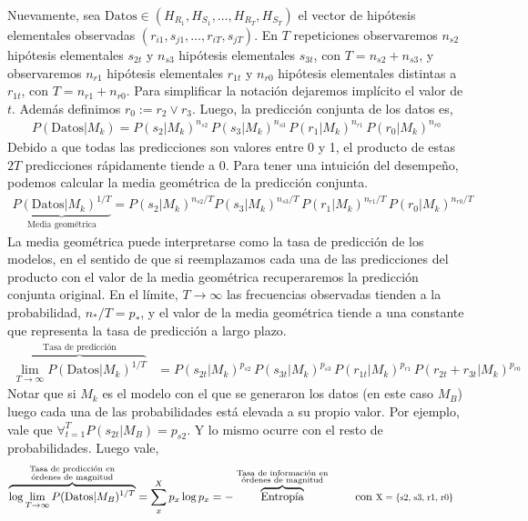 \documentclass[a4paper,11pt]{book}
\newcommand\hfrac[2]{\genfrac{}{}{0pt}{}{#1}{#2}} %
\theoremstyle{definition}
\begin{document}

Nuevamente, sea $\text{Datos}\in (H_{R_1}, H_{S_1}, \dots, H_{R_T}, H_{S_T})$ el vector de hip\'otesis elementales observadas $(r_{i1}, s_{j1}, \dots, r_{iT}, s_{jT})$.
%
En $T$ repeticiones observaremos $n_{s2}$ hip\'otesis elementales $s_{2t}$ y $n_{s3}$ hip\'otesis elementales $s_{3t}$, con $T=n_{s2} + n_{s3}$, y observaremos $n_{r1}$ hip\'otesis elementales $r_{1t}$ y $n_{r0}$ hip\'otesis elementales distintas a $r_{1t}$, con $T=n_{r1} + n_{r0}$.
%
Para simplificar la notaci\'on dejaremos impl\'icito el valor de $t$.
%
Adem\'as definimos $r_0 := r_{2} \lor r_{3}$.
%
Luego, la predicci\'on conjunta de los datos es,
%
\begin{align*}
P(\text{Datos}| M_k) = P(s_{2}|M_k)^{n_{s2}} \, P(s_{3}|M_k)^{n_{s3}} \, P(r_{1}|M_k)^{n_{r1}} \, P(r_{0} |M_k)^{n_{r0}}
\end{align*}
%
Debido a que todas las predicciones son valores entre 0 y 1, el producto de estas $2T$ predicciones r\'apidamente tiende a 0.
%
Para tener una intuici\'on del desempe\~no, podemos calcular la media geom\'etrica de la predicci\'on conjunta.
%
\begin{align*}
\underbrace{P(\text{Datos}| M_k)^{1/T}}_{\text{Media geom\'etrica}} =P(s_{2}|M_k)^{n_{s2}/T}  P(s_{3}|M_k)^{n_{s3}/T} \, P(r_{1}|M_k)^{n_{r1}/T} \, P(r_{0} |M_k)^{n_{r0}/T}
\end{align*}
%
La media geom\'etrica puede interpretarse como la tasa de predicci\'on de los modelos, en el sentido de que si reemplazamos cada una de las predicciones del producto con el valor de la media geom\'etrica recuperaremos la predicci\'on conjunta original.
%
En el l\'imite, $T\rightarrow\infty$ las frecuencias observadas tienden a la probabilidad, $n_{*}/T = p_*$, y el valor de la media geom\'etrica tiende a una constante que representa la tasa de predicci\'on a largo plazo.
%
\begin{align*}
\overbrace{\lim_{T \rightarrow \infty} P(\text{Datos}|M_k)^{1/T}}^{\text{Tasa de predicci\'on}} &= P(s_{2t}|M_k)^{p_{s2}} \, P(s_{3t}|M_k)^{p_{s3}} \, P(r_{1t}|M_k)^{p_{r1}} \, P(r_{2t} + r_{3t} |M_k)^{p_{r0}}
\end{align*}
%
Notar que si $M_k$ es el modelo con el que se generaron los datos (en este caso $M_B$) luego cada una de las probabilidades est\'a elevada a su propio valor.
%
Por ejemplo, vale que $\forall_{t=1}^T P(s_{2t}|M_B)= p_{s2}$.
%
Y lo mismo ocurre con el resto de probabilidades.
%
Luego vale,
%
\begin{align*}
\overbrace{\log \lim_{T \rightarrow \infty} P(\text{Datos}|M_B)^{1/T}}^{\hfrac{\text{\scriptsize Tasa de predicci\'on en}}{\text{\scriptsize \'ordenes de magnitud}}} &= \sum_x^X p_x \log p_x = - \overbrace{\text{Entrop\'ia}}^{\hfrac{\text{\scriptsize Tasa de informaci\'on en}}{\text{\scriptsize \'ordenes de magnitud}}} \hspace{0.75cm}  \text{con } \scalebox{0.8}{X = \{s2, s3, r1, r0\}}
\end{align*}
\end{document}
